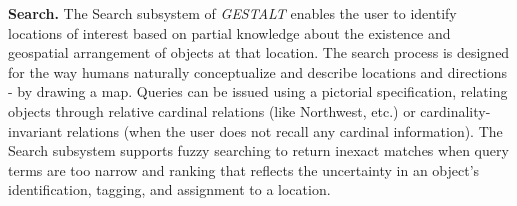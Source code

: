 \textbf{Search.}
The Search subsystem of \emph{GESTALT} enables the user to identify locations of interest based on partial knowledge about the existence and geospatial arrangement of objects at that location. 
The search process is designed for the way humans naturally conceptualize and describe locations and directions - by drawing a map.
Queries can be issued using a pictorial specification, relating objects through relative cardinal relations (like Northwest, etc.) or cardinality-invariant relations (when the user does not recall any cardinal information).
The Search subsystem supports fuzzy searching to return inexact matches when query terms are too narrow and ranking that reflects the uncertainty in an object's identification, tagging, and assignment to a location.









